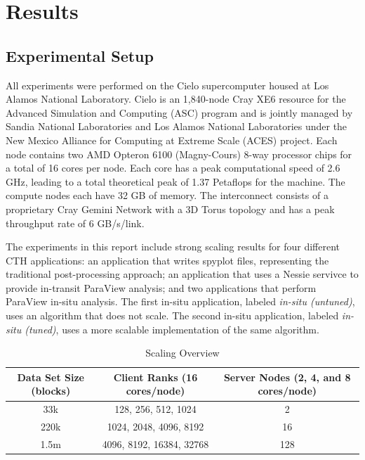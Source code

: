 \section{Results}
\label{sec:Results}


\subsection{Experimental Setup}

All experiments were performed on the Cielo supercomputer housed at Los Alamos
National Laboratory.  Cielo is an 1,840-node Cray XE6 resource for the Advanced
Simulation and Computing (ASC) program and is jointly managed by Sandia National 
Laboratories and Los Alamos National Laboratories under the New Mexico
Alliance for Computing at Extreme Scale (ACES) project.  Each node contains
two AMD Opteron 6100 (Magny-Cours) 8-way processor chips for a total of 16 cores
per node.  Each core has a peak computational speed of 2.6 GHz, leading to a total 
theoretical peak of 1.37 Petaflops for the machine. The compute nodes each
have 32 GB of memory.  The interconnect consists of a proprietary Cray Gemini
Network with a 3D Torus topology and has a peak throughput rate of 6 GB/s/link. 

The experiments in this report include strong scaling results for four different
CTH applications: an application that writes spyplot files, representing the traditional 
post-processing approach; an application that uses a Nessie servivce to provide in-transit
ParaView analysis; and two applications that perform ParaView in-situ analysis.  The first 
in-situ application, labeled \emph{in-situ (untuned)}, uses an algorithm that does not scale.
The second in-situ application, labeled \emph{in-situ (tuned)}, uses a more
scalable implementation of the same algorithm.  

\begin{table}

\caption{Scaling Overview}
\label{tab:ScalingOverview}

\centering{}%
\begin{tabular}{|c|c|c|}
\hline 
Data Set Size (blocks) & Client Ranks (16 cores/node) & Server Nodes (2, 4, and 8 cores/node)\tabularnewline
\hline 
\hline 
33k & 128, 256, 512, 1024 & 2\tabularnewline
\hline 
220k & 1024, 2048, 4096, 8192 & 16\tabularnewline
\hline 
1.5m & 4096, 8192, 16384, 32768 & 128\tabularnewline
\hline 
\end{tabular}
\end{table}

